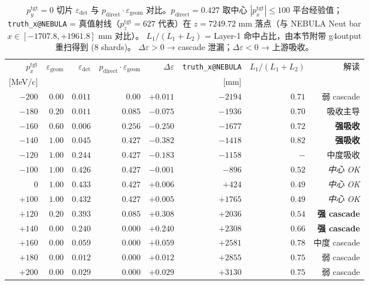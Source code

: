 \documentclass[a4paper,11pt]{ctexart}
\begin{document}
\begin{table}[h]
\centering
\caption{$p_y^\mathrm{tgt}=0$ 切片 $\varepsilon_\mathrm{det}$ 与 $p_\mathrm{direct} \cdot \varepsilon_\mathrm{geom}$
对比。$p_\mathrm{direct}=0.427$ 取中心 $|p_x^\mathrm{tgt}| \le 100$ 平台经验值；
\texttt{truth\_x@NEBULA} = 真值射线（$p_z^\mathrm{tgt}=627$ 代表）在 $z=7249.72$ mm
落点（与 NEBULA Neut bar $x \in [-1707.8, +1961.8]$ mm 对比）。
$L_1/(L_1+L_2)$ = Layer-1 命中占比，由本节附带 g4output 重扫得到 (8 shards)。
$\Delta\varepsilon > 0$ → cascade 泄漏；$\Delta\varepsilon < 0$ → 上游吸收。}
\label{tab:cascade_residual}
\small
\begin{tabular}{rrrrrrrr}
\toprule
$p_x^\mathrm{tgt}$ &
$\varepsilon_\mathrm{geom}$ &
$\varepsilon_\mathrm{det}$ &
$p_\mathrm{direct}\cdot\varepsilon_\mathrm{geom}$ &
$\Delta\varepsilon$ &
\texttt{truth\_x@NEBULA} &
$L_1/(L_1{+}L_2)$ &
解读 \\
$[$MeV/c$]$ & & & & & [mm] & & \\
\midrule
$-200$ & $0.00$ & $0.011$ & $0.00$ & $+0.011$ & $-2194$ & $0.71$ & 弱 cascade \\
$-180$ & $0.20$ & $0.011$ & $0.085$ & $-0.075$ & $-1936$ & $0.70$ & 吸收主导 \\
$-160$ & $0.60$ & $0.006$ & $0.256$ & $-0.250$ & $-1677$ & $0.72$ & \textbf{强吸收} \\
$-140$ & $1.00$ & $0.045$ & $0.427$ & $-0.382$ & $-1418$ & $0.82$ & \textbf{强吸收} \\
$-120$ & $1.00$ & $0.244$ & $0.427$ & $-0.183$ & $-1158$ & $-$ & 中度吸收 \\
$-100$ & $1.00$ & $0.426$ & $0.427$ & $-0.001$ & $-896$  & $0.52$ & \emph{中心 OK} \\
$0$    & $1.00$ & $0.433$ & $0.427$ & $+0.006$ & $+424$  & $0.49$ & \emph{中心 OK} \\
$+100$ & $1.00$ & $0.432$ & $0.427$ & $+0.005$ & $+1765$ & $0.49$ & \emph{中心 OK} \\
$+120$ & $0.20$ & $0.393$ & $0.085$ & $+0.308$ & $+2036$ & $0.54$ & \textbf{强 cascade} \\
$+140$ & $0.00$ & $0.240$ & $0.000$ & $+0.240$ & $+2308$ & $0.66$ & \textbf{强 cascade} \\
$+160$ & $0.00$ & $0.059$ & $0.000$ & $+0.059$ & $+2581$ & $0.78$ & 中度 cascade \\
$+180$ & $0.00$ & $0.012$ & $0.000$ & $+0.012$ & $+2855$ & $0.75$ & 弱 cascade \\
$+200$ & $0.00$ & $0.029$ & $0.000$ & $+0.029$ & $+3130$ & $0.75$ & 弱 cascade \\
\bottomrule
\end{tabular}
\end{table}
\end{document}
